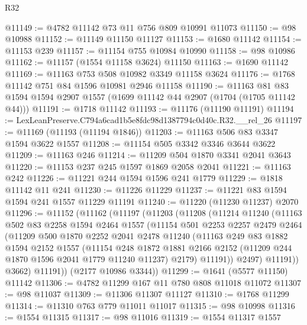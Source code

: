 \begin{lexlean}{R32}
\begin{coremodule}
@11149 := @4782 @11142 @73 @11 @756 @809 @10991 @11073
@11150 := @98 @10988
@11152 := @11149 @11150 @11127
@11153 := @1680 @11142
@11154 := @11153 @239
@11157 := @11154 @755 @10984 @10990
@11158 := @98 @10986
@11162 := @11157 (@1554 @11158 @3624) @11150
@11163 := @1690 @11142
@11169 := @11163 @753 @508 @10982 @3349 @11158 @3624
@11176 := @1768 @11142 @751 @84 @1596 @10981 @2946 @11158
@11190 := @11163 @81 @83 @1594 @1594 @2907 @1557 (@1699 @11142 @44 @2907 (@1704 (@1705 @11142 @44)))
@11191 := @1718 @11142
@11193 := @11176 (@11190 @11191)
@11194 := LexLeanPreserve.C794a6cad1b5e8fdc98d1387794c0d40c.R32.__rel_26
@11197 := @11169 (@11193 (@11194 @1846))
@11203 := @11163 @506 @83 @3347 @1594 @3622 @1557
@11208 := @11154 @505 @3342 @3346 @3644 @3622
@11209 := @11163 @246
@11214 := @11209 @504 @1870 @3341 @2041 @3643
@11220 := @11153 @237 @245 @1597 @1869 @2058 @2041
@11221 := @11163 @242
@11226 := @11221 @244 @1594 @1596 @241 @1779
@11229 := @1818 @11142 @11 @241
@11230 := @11226 @11229
@11237 := @11221 @83 @1594 @1594 @241 @1557 @11229 @11191
@11240 := @11220 (@11230 @11237) @2070
@11296 := @11152
    (@11162
      (@11197
        (@11203
          (@11208
            (@11214
              @11240
              (@11163
                @502
                @83
                @2258
                @1594
                @2464
                @1557
                (@11154
                  @501
                  @2253
                  @2257
                  @2479
                  @2464
                  (@11209
                    @500
                    @1870
                    @2252
                    @2041
                    @2478
                    @11240
                    (@11163
                      @249
                      @83
                      @1882
                      @1594
                      @2152
                      @1557
                      (@11154
                        @248
                        @1872
                        @1881
                        @2166
                        @2152
                        (@11209 @244 @1870 @1596 @2041 @1779 @11240 @11237)
                        @2179)
                      @11191))
                  @2497)
                @11191))
            @3662)
          @11191))
      (@2177 @10986 @3344))
@11299 := @1641 (@5577 @11150) @11142
@11306 := @4782 @11299 @167 @11 @780 @808 @11018 @11072
@11307 := @98 @11037
@11309 := @11306 @11307 @11127
@11310 := @1768 @11299
@11314 := @11310 @763 @779 @11011 @11017
@11315 := @98 @10998
@11316 := @1554 @11315
@11317 := @98 @11016
@11319 := @1554 @11317 @1557

\end{coremodule}
\end{lexlean}
